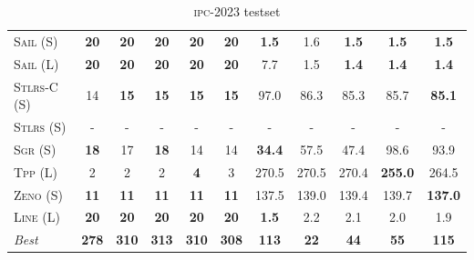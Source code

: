 \documentclass[11pt]{article}
\begin{document}
\begin{table}[tb]
{\begin{tabular}{|l||ccccc||ccccc||}
\textsc{Sail} (S)&\textbf{20}&\textbf{20}&\textbf{20}&\textbf{20}&\textbf{20}&\textbf{1.5}&1.6&\textbf{1.5}&\textbf{1.5}&\textbf{1.5}\\
\textsc{Sail} (L)&\textbf{20}&\textbf{20}&\textbf{20}&\textbf{20}&\textbf{20}&7.7&1.5&\textbf{1.4}&\textbf{1.4}&\textbf{1.4}\\
\textsc{Stlrs-C} (S)&14&\textbf{15}&\textbf{15}&\textbf{15}&\textbf{15}&97.0&86.3&85.3&85.7&\textbf{85.1}\\
\textsc{Stlrs} (S)&-&-&-&-&-&-&-&-&-&-\\
\textsc{Sgr} (S)&\textbf{18}&17&\textbf{18}&14&14&\textbf{34.4}&57.5&47.4&98.6&93.9\\
\textsc{Tpp} (L)&2&2&2&\textbf{4}&3&270.5&270.5&270.4&\textbf{255.0}&264.5\\
\textsc{Zeno} (S)&\textbf{11}&\textbf{11}&\textbf{11}&\textbf{11}&\textbf{11}&137.5&139.0&139.4&139.7&\textbf{137.0}\\
\textsc{Line} (L)&\textbf{20}&\textbf{20}&\textbf{20}&\textbf{20}&\textbf{20}&\textbf{1.5}&2.2&2.1&2.0&1.9
\\\hline
\textit{Best}&\textbf{278}&\textbf{310}&\textbf{313}&\textbf{310}&\textbf{308}&\textbf{113}&\textbf{22}&\textbf{44}&\textbf{55}&\textbf{115}\\\hline

        \end{tabular}}
        \caption{\textsc{ipc}-2023 testset}
        \label{tab:ipc}
        \end{table}
        
\end{document}
